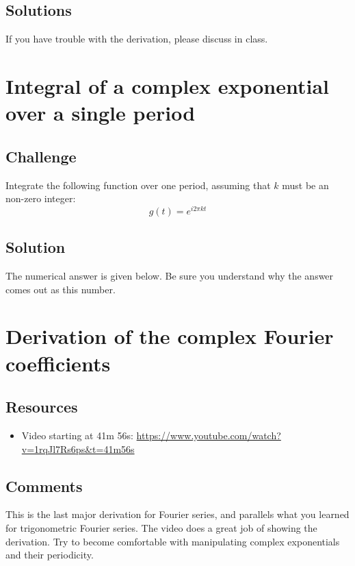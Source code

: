 \subsection*{Solutions}
If you have trouble with the derivation, please discuss in class.




\newpage
\section{Integral of a complex exponential over a single period}

\subsection*{Challenge}
Integrate the following function over one period, assuming that $k$ must be an non-zero integer:
\begin{equation}
    g(t) = e^{i 2 \pi k t}
\end{equation}

\subsection*{Solution}
The numerical answer is given below. Be sure you understand why the answer comes out as this number.





\newpage
\section{Derivation of the complex Fourier coefficients}

\subsection*{Resources}
\begin{itemize}
    \item Video starting at 41m 56s: \url{https://www.youtube.com/watch?v=1rqJl7Rs6ps&t=41m56s}
\end{itemize}

\subsection*{Comments}
This is the last major derivation for Fourier series, and parallels what you learned for trigonometric Fourier series. The video does a great job of showing the derivation. Try to become comfortable with manipulating complex exponentials and their periodicity.

